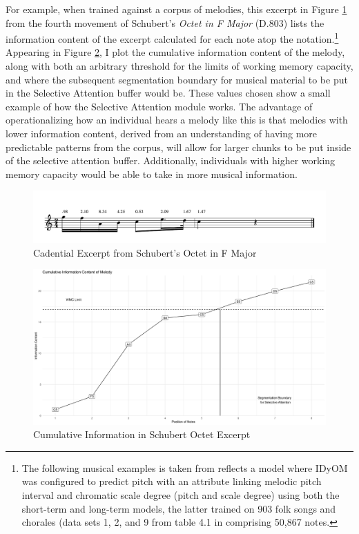 \documentclass[12pt,]{book}
\let\rmarkdownfootnote\footnote%
\def\footnote{\protect\rmarkdownfootnote}
\begin{document}
For example, when trained against a corpus of melodies, this excerpt in Figure \ref{fig:schubertF} from the fourth movement of Schubert's \emph{Octet in F Major} (D.803) lists the information content of the excerpt calculated for each note atop the notation.\footnote{The following musical examples is taken from \citet{pearceStatisticalLearningProbabilistic2018a} reflects a model where IDyOM was configured to predict pitch with an attribute linking melodic pitch interval and chromatic scale degree (pitch and scale degree) using both the short-term and long-term models, the latter trained on 903 folk songs and chorales (data sets 1, 2, and 9 from table 4.1 in \citep{schaffrathEssenFolkSong1995} comprising 50,867 notes.}
Appearing in Figure \ref{fig:cumSchubert}, I plot the cumulative information content of the melody, along with both an arbitrary threshold for the limits of working memory capacity, and where the subsequent segmentation boundary for musical material to be put in the Selective Attention buffer would be.
These values chosen show a small example of how the Selective Attention module works.
The advantage of operationalizing how an individual hears a melody like this is that melodies with lower information content, derived from an understanding of having more predictable patterns from the corpus, will allow for larger chunks to be put inside of the selective attention buffer.
Additionally, individuals with higher working memory capacity would be able to take in more musical information.

\begin{figure}

{\centering \includegraphics[width=1\linewidth]{img/SchubertF} 

}

\caption{Cadential Excerpt from Schubert's Octet in F Major}\label{fig:schubertF}
\end{figure}

\begin{figure}

{\centering \includegraphics[width=1\linewidth]{img/SchubertPlotNew} 

}

\caption{Cumulative Information in Schubert Octet Excerpt}\label{fig:cumSchubert}
\end{figure}
\end{document}
